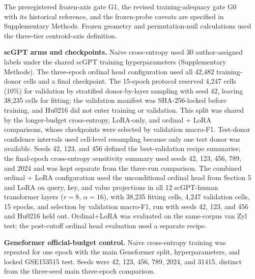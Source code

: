 \documentclass[12pt,letterpaper]{article}
\begin{document}
The preregistered frozen-axis gate G1, the revised training-adequacy gate G0 with its historical reference, and the frozen-probe caveats are specified in Supplementary Methods. Frozen geometry and permutation-null calculations used the three-tier centroid-axis definition.

\textbf{scGPT arms and checkpoints.} Naive cross-entropy used 30 author-assigned labels under the shared scGPT training hyperparameters (Supplementary Methods). The three-epoch ordinal head configuration used all 42,482 training-donor cells and a final checkpoint. The 15-epoch protocol reserved 4,247 cells (10\%) for validation by stratified donor-by-layer sampling with seed 42, leaving 38,235 cells for fitting; the validation manifest was SHA-256-locked before training, and Hu0216 did not enter training or validation. This split was shared by the longer-budget cross-entropy, LoRA-only, and ordinal + LoRA comparisons, whose checkpoints were selected by validation macro-F1. Test-donor confidence intervals used cell-level resampling because only one test donor was available. Seeds 42, 123, and 456 defined the best-validation recipe summaries; the final-epoch cross-entropy sensitivity summary used seeds 42, 123, 456, 789, and 2024 and was kept separate from the three-run comparison. The combined ordinal + LoRA configuration used the unconditional ordinal head from Section 5 and LoRA on query, key, and value projections in all 12 scGPT-human transformer layers ($r=8$, $\alpha=16$), with 38,235 fitting cells, 4,247 validation cells, 15 epochs, and selection by validation macro-F1, run with seeds 42, 123, and 456 and Hu0216 held out. Ordinal+LoRA was evaluated on the same-corpus van Zyl test; the post-cutoff ordinal head evaluation used a separate recipe.

\textbf{Geneformer official-budget control.} Naive cross-entropy training was repeated for one epoch with the main Geneformer split, hyperparameters, and locked GSE153515 test. Seeds were 42, 123, 456, 789, 2024, and 31415, distinct from the three-seed main three-epoch comparison.
\end{document}
